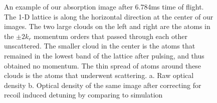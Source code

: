 \documentclass[12pt]{iopart}
\begin{document}
\begin{figure}
\caption{An example of our absorption image after 6.784ms time of flight. The 1-D lattice is along the horizontal direction at the center of our images. The two large clouds on the left and right are the atoms in the $\pm 2k_r$ momentum orders that passed through each other unscattered. The smaller cloud in the center is the atoms that remained in the lowest band of the lattice after pulsing, and thus obtained no momentum. The thin spread of atoms around these clouds is the atoms that underwent scattering.  a. Raw optical density b. Optical density of the same image after correcting for recoil induced detuning by comparing to simulation}  
\label{fig:SampleCorrection}
\end{figure}
\end{document}
